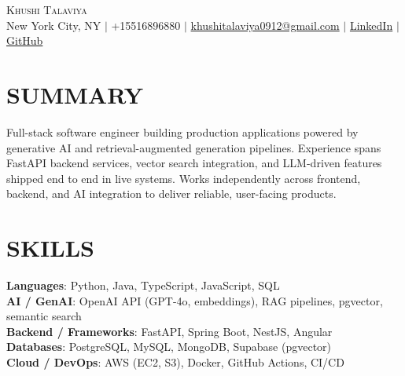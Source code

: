 \documentclass[letterpaper,11pt]{article}
\begin{document}
\begin{center}
    {\Huge \scshape Khushi Talaviya} \\ \vspace{2pt}
    \vspace{4pt}
    \small
    New York City, NY $|$
    \small
    +15516896880 $|$
    \href{mailto:khushitalaviya0912@gmail.com}{khushitalaviya0912@gmail.com} $|$
    \href{https://www.linkedin.com/in/khushitalaviya/}{LinkedIn} $|$
    \href{https://github.com/talaviyakhushi}{GitHub}
\end{center}

\section{SUMMARY}
\vspace{5pt}
\small{Full-stack software engineer building production applications powered by generative AI and retrieval-augmented generation pipelines. Experience spans FastAPI backend services, vector search integration, and LLM-driven features shipped end to end in live systems. Works independently across frontend, backend, and AI integration to deliver reliable, user-facing products.}

\vspace{2pt}
\section{SKILLS}
\vspace{5pt}
\begin{itemize}[leftmargin=0in, label={}]
\small{\item{
\textbf{Languages}{: Python, Java, TypeScript, JavaScript, SQL} \\
\textbf{AI / GenAI}{: OpenAI API (GPT-4o, embeddings), RAG pipelines, pgvector, semantic search} \\
\textbf{Backend / Frameworks}{: FastAPI, Spring Boot, NestJS, Angular} \\
\textbf{Databases}{: PostgreSQL, MySQL, MongoDB, Supabase (pgvector)} \\
\textbf{Cloud / DevOps}{: AWS (EC2, S3), Docker, GitHub Actions, CI/CD}
}}
\end{itemize}
\vspace{-10pt}

\end{document}
